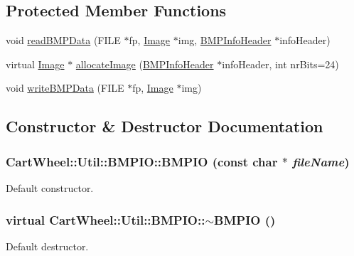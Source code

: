 \subsection*{Protected Member Functions}
\begin{DoxyCompactItemize}
\item 
void \hyperlink{classCartWheel_1_1Util_1_1BMPIO_aa68430d62acfd0ada0da17d2e6f64f3b}{readBMPData} (FILE $\ast$fp, \hyperlink{classCartWheel_1_1Util_1_1Image}{Image} $\ast$img, \hyperlink{classCartWheel_1_1Util_1_1BMPInfoHeader}{BMPInfoHeader} $\ast$infoHeader)
\item 
virtual \hyperlink{classCartWheel_1_1Util_1_1Image}{Image} $\ast$ \hyperlink{classCartWheel_1_1Util_1_1BMPIO_ada79536ad8a3d1930b0b881efabc159b}{allocateImage} (\hyperlink{classCartWheel_1_1Util_1_1BMPInfoHeader}{BMPInfoHeader} $\ast$infoHeader, int nrBits=24)
\item 
void \hyperlink{classCartWheel_1_1Util_1_1BMPIO_a15c96abcfc88291fab0bcaf8ecad0a10}{writeBMPData} (FILE $\ast$fp, \hyperlink{classCartWheel_1_1Util_1_1Image}{Image} $\ast$img)
\end{DoxyCompactItemize}


\subsection{Constructor \& Destructor Documentation}
\hypertarget{classCartWheel_1_1Util_1_1BMPIO_a2bbfc44eb983401f19bbc3ff4fa60e1b}{
\subsubsection[{BMPIO}]{\setlength{\rightskip}{0pt plus 5cm}CartWheel::Util::BMPIO::BMPIO (const char $\ast$ {\em fileName})}}
\label{classCartWheel_1_1Util_1_1BMPIO_a2bbfc44eb983401f19bbc3ff4fa60e1b}
Default constructor. \hypertarget{classCartWheel_1_1Util_1_1BMPIO_a5b8f58a06502d178ccc7f97f165e6a82}{
\subsubsection[{$\sim$BMPIO}]{\setlength{\rightskip}{0pt plus 5cm}virtual CartWheel::Util::BMPIO::$\sim$BMPIO ()}}
\label{classCartWheel_1_1Util_1_1BMPIO_a5b8f58a06502d178ccc7f97f165e6a82}
Default destructor. 

